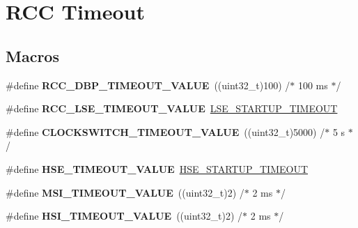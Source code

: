 \hypertarget{group___r_c_c___timeout}{\section{R\-C\-C Timeout}
\label{group___r_c_c___timeout}
}
\subsection*{Macros}
\begin{DoxyCompactItemize}
\item 
\hypertarget{group___r_c_c___timeout_gae578b5efd6bd38193ab426ce65cb77b1}{\#define {\bfseries R\-C\-C\-\_\-\-D\-B\-P\-\_\-\-T\-I\-M\-E\-O\-U\-T\-\_\-\-V\-A\-L\-U\-E}~((uint32\-\_\-t)100)       /$\ast$ 100 ms $\ast$/}\label{group___r_c_c___timeout_gae578b5efd6bd38193ab426ce65cb77b1}

\item 
\hypertarget{group___r_c_c___timeout_gafe8ed1c0ca0e1c17ea69e09391498cc7}{\#define {\bfseries R\-C\-C\-\_\-\-L\-S\-E\-\_\-\-T\-I\-M\-E\-O\-U\-T\-\_\-\-V\-A\-L\-U\-E}~\hyperlink{stm32l1xx__hal__conf_8h_a85e6fc812dc26f7161a04be2568a5462}{L\-S\-E\-\_\-\-S\-T\-A\-R\-T\-U\-P\-\_\-\-T\-I\-M\-E\-O\-U\-T}}\label{group___r_c_c___timeout_gafe8ed1c0ca0e1c17ea69e09391498cc7}

\item 
\hypertarget{group___r_c_c___timeout_gab3caadc0f23d394d1033aba55d31fcdc}{\#define {\bfseries C\-L\-O\-C\-K\-S\-W\-I\-T\-C\-H\-\_\-\-T\-I\-M\-E\-O\-U\-T\-\_\-\-V\-A\-L\-U\-E}~((uint32\-\_\-t)5000)  /$\ast$ 5 s    $\ast$/}\label{group___r_c_c___timeout_gab3caadc0f23d394d1033aba55d31fcdc}

\item 
\hypertarget{group___r_c_c___timeout_gac0cd4ed24fa948844e1a40b12c450f32}{\#define {\bfseries H\-S\-E\-\_\-\-T\-I\-M\-E\-O\-U\-T\-\_\-\-V\-A\-L\-U\-E}~\hyperlink{stm32l1xx__hal__conf_8h_a68ecbc9b0a1a40a1ec9d18d5e9747c4f}{H\-S\-E\-\_\-\-S\-T\-A\-R\-T\-U\-P\-\_\-\-T\-I\-M\-E\-O\-U\-T}}\label{group___r_c_c___timeout_gac0cd4ed24fa948844e1a40b12c450f32}

\item 
\hypertarget{group___r_c_c___timeout_gaaf2d201a5de069ae452276eaf664bb38}{\#define {\bfseries M\-S\-I\-\_\-\-T\-I\-M\-E\-O\-U\-T\-\_\-\-V\-A\-L\-U\-E}~((uint32\-\_\-t)2)      /$\ast$ 2 ms $\ast$/}\label{group___r_c_c___timeout_gaaf2d201a5de069ae452276eaf664bb38}

\item 
\hypertarget{group___r_c_c___timeout_gad9e56670dcbbe9dbc3a8971b36bbec58}{\#define {\bfseries H\-S\-I\-\_\-\-T\-I\-M\-E\-O\-U\-T\-\_\-\-V\-A\-L\-U\-E}~((uint32\-\_\-t)2)      /$\ast$ 2 ms $\ast$/}\label{group___r_c_c___timeout_gad9e56670dcbbe9dbc3a8971b36bbec58}


\end{DoxyCompactItemize}
